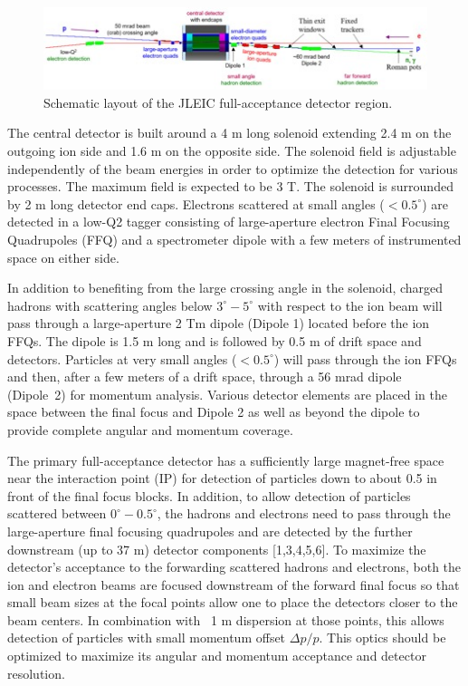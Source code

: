 \begin{figure}
\centering
\includegraphics[width=.75\textwidth]{../../img/detector_schematic.jpg}
\caption{Schematic layout of the JLEIC full-acceptance detector region.}
\label{fig:detector_concept}
\end{figure}

The central detector is built around a 4 m long solenoid extending 2.4 m on the outgoing ion side and 1.6 m on the opposite side. The solenoid field is adjustable independently of the beam energies in order to optimize the detection for various processes. The maximum field is expected to be 3 T. The solenoid is surrounded by 2 m long detector end caps. Electrons scattered at small angles ($<0.5^{\circ}$) are detected in a low-Q2 tagger consisting of large-aperture electron Final Focusing Quadrupoles (FFQ) and a spectrometer dipole with a few meters of instrumented space on either side.

In addition to benefiting from the large crossing angle in the solenoid, charged hadrons with scattering angles below $3^{\circ}-5^{\circ}$ with respect to the ion beam will pass through a large-aperture 2 Tm dipole (Dipole 1) located before the ion FFQs. The dipole is 1.5 m long and is followed by 0.5 m of drift space and detectors. Particles at very small angles ($<0.5^{\circ}$)  will pass through the ion FFQs and then, after a few meters of a drift space, through a 56 mrad dipole (Dipole 2) for momentum analysis. Various detector elements are placed in the space between the final focus and Dipole 2 as well as beyond the dipole to provide complete angular and momentum coverage.

The primary full-acceptance detector has a sufficiently large magnet-free space near the interaction point (IP) for detection of particles down to about 0.5 in front of the final focus blocks. In addition, to allow detection of particles scattered between $0^{\circ}-0.5^{\circ}$, the hadrons and electrons need to pass through the large-aperture final focusing quadrupoles and are detected by the further downstream (up to 37 m) detector components [1,3,4,5,6]. To maximize the detector’s acceptance to the forwarding scattered hadrons and electrons, both the ion and electron beams are focused downstream of the forward final focus so that small beam sizes at the focal points allow one to place the detectors closer to the beam centers. In combination with ~1 m dispersion at those points, this allows detection of particles with small momentum offset $\Delta p/p$. This optics should be optimized to maximize its angular and momentum acceptance and detector resolution. 

